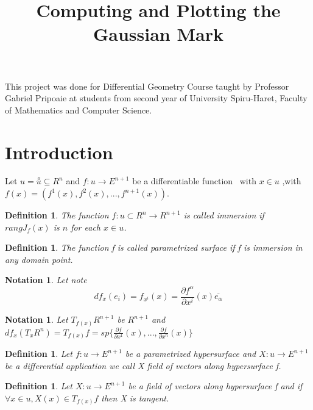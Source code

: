 \documentclass[a4paper]{article}
\newtheorem{definition}[theorem]{Definition}
\newtheorem{notation}[theorem]{Notation}
\begin{document}
\title{Computing and Plotting the Gaussian Mark}
\date{}
\author{}
\maketitle

This project was done for Differential Geometry Course taught by Professor
Gabriel Pripoaie at students from second year of University Spiru-Haret,
Faculty of Mathematics and Computer Science.

\section{Introduction}

Let $u=\overset{o}{u}\subseteq R^{n}$ and $f:u\rightarrow E^{n+1}$ be a
differentiable function \ with $x\in u$ ,with $%
f(x)=(f^{1}(x),f^{2}(x),...,f^{n+1}(x))$.

\begin{definition}
The function $f:u\subset R^{n}\rightarrow R^{n+1}$ is called immersion if $%
rangJ_{f}(x)$ is $n$ for each $x\in u$.
\end{definition}

\begin{definition}
The function f is called parametrized surface if f is immersion in any
domain point.
\end{definition}

\begin{notation}
Let note 
\begin{equation*}
df_{x}(e_{i})=f_{x^{i}}(x)=\frac{\partial f^{\alpha }}{\partial x^{i}}(x)%
\overline{e_{\alpha }}
\end{equation*}
\end{notation}

\begin{notation}
Let $T_{f(x)}R^{n+1}$ be $R^{n+1}$ and $df_{x}(T_{x}R^{n})=T_{f(x)}f=sp\{%
\frac{\partial f}{\partial x^{1}}(x),...,\frac{\partial f}{\partial x^{n}}%
(x)\}$
\end{notation}

\begin{definition}
Let $f:u\rightarrow E^{n+1}$ be a parametrized hypersurface and $%
X:u\rightarrow E^{n+1}$ be a differential application we call X field of
vectors along hypersurface f.
\end{definition}

\begin{definition}
Let $X:u\rightarrow E^{n+1}$ be a field of vectors along hypersurface f and
if $\forall x\in u,X(x)\in T_{f(x)}f$ then X is tangent.
\end{definition}
\end{document}
